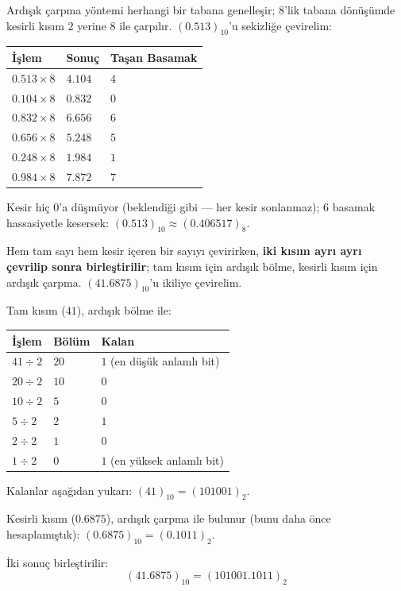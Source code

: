 \begin{ornek}
Ardışık çarpma yöntemi herhangi bir tabana genelleşir; $8$'lik tabana dönüşümde kesirli
kısım $2$ yerine $8$ ile çarpılır. $(0.513)_{10}$'u
sekizliğe çevirelim:
\begin{center}
\begin{tabular}{lll}
\toprule
İşlem & Sonuç & Taşan Basamak \\
\midrule
$0.513\times8$ & $4.104$ & $4$ \\
$0.104\times8$ & $0.832$ & $0$ \\
$0.832\times8$ & $6.656$ & $6$ \\
$0.656\times8$ & $5.248$ & $5$ \\
$0.248\times8$ & $1.984$ & $1$ \\
$0.984\times8$ & $7.872$ & $7$ \\
\bottomrule
\end{tabular}
\end{center}
Kesir hiç $0$'a düşmüyor (beklendiği gibi --- her kesir sonlanmaz); $6$ basamak hassasiyetle
kesersek: $(0.513)_{10} \approx (0.406517)_8$.
\end{ornek}

\begin{ornek}
Hem tam sayı hem kesir içeren bir sayıyı çevirirken, \textbf{iki kısım ayrı ayrı çevrilip
sonra birleştirilir}; tam kısım için ardışık bölme, kesirli kısım için ardışık çarpma.
$(41.6875)_{10}$'u ikiliye çevirelim.

Tam kısım ($41$), ardışık bölme ile:
\begin{center}
\begin{tabular}{lll}
\toprule
İşlem & Bölüm & Kalan \\
\midrule
$41 \div 2$ & $20$ & $1$ (en düşük anlamlı bit) \\
$20 \div 2$ & $10$ & $0$ \\
$10 \div 2$ & $5$ & $0$ \\
$5 \div 2$ & $2$ & $1$ \\
$2 \div 2$ & $1$ & $0$ \\
$1 \div 2$ & $0$ & $1$ (en yüksek anlamlı bit) \\
\bottomrule
\end{tabular}
\end{center}
Kalanlar aşağıdan yukarı: $(41)_{10}=(101001)_2$.

Kesirli kısım ($0.6875$), ardışık çarpma ile bulunur (bunu daha önce hesaplamıştık):
$(0.6875)_{10}=(0.1011)_2$.

İki sonuç birleştirilir:
\[
(41.6875)_{10} = (101001.1011)_2
\]
\end{ornek}

